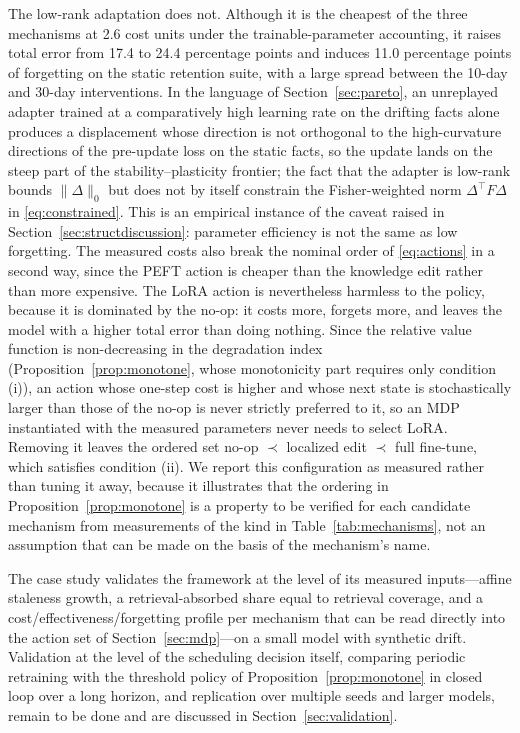 \documentclass[electronics,article,submit,pdftex,moreauthors]{Definitions/mdpi}
\newcommand{\D}{\varDelta}                 %
\begin{document}
The low-rank adaptation does not. Although it is the cheapest of the three mechanisms at 2.6 cost units under the trainable-parameter accounting, it raises total error from 17.4 to 24.4 percentage points and induces 11.0 percentage points of forgetting on the static retention suite, with a large spread between the 10-day and 30-day interventions. In the language of Section~\ref{sec:pareto}, an unreplayed adapter trained at a comparatively high learning rate on the drifting facts alone produces a displacement whose direction is not orthogonal to the high-curvature directions of the pre-update loss on the static facts, so the update lands on the steep part of the stability--plasticity frontier; the fact that the adapter is low-rank bounds $\|\D\|_0$ but does not by itself constrain the Fisher-weighted norm $\D^{\top}F\D$ in \eqref{eq:constrained}. This is an empirical instance of the caveat raised in Section~\ref{sec:structdiscussion}: parameter efficiency is not the same as low forgetting. The measured costs also break the nominal order of \eqref{eq:actions} in a second way, since the PEFT action is cheaper than the knowledge edit rather than more expensive. The LoRA action is nevertheless harmless to the policy, because it is dominated by the no-op: it costs more, forgets more, and leaves the model with a higher total error than doing nothing. Since the relative value function is non-decreasing in the degradation index (Proposition~\ref{prop:monotone}, whose monotonicity part requires only condition (i)), an action whose one-step cost is higher and whose next state is stochastically larger than those of the no-op is never strictly preferred to it, so an MDP instantiated with the measured parameters never needs to select LoRA. Removing it leaves the ordered set no-op $\prec$ localized edit $\prec$ full fine-tune, which satisfies condition (ii). We report this configuration as measured rather than tuning it away, because it illustrates that the ordering in Proposition~\ref{prop:monotone} is a property to be verified for each candidate mechanism from measurements of the kind in Table~\ref{tab:mechanisms}, not an assumption that can be made on the basis of the mechanism's name.

The case study validates the framework at the level of its measured inputs---affine staleness growth, a retrieval-absorbed share equal to retrieval coverage, and a cost/effectiveness/forgetting profile per mechanism that can be read directly into the action set of Section~\ref{sec:mdp}---on a small model with synthetic drift. Validation at the level of the scheduling decision itself, comparing periodic retraining with the threshold policy of Proposition~\ref{prop:monotone} in closed loop over a long horizon, and replication over multiple seeds and larger models, remain to be done and are discussed in Section~\ref{sec:validation}.
\end{document}
